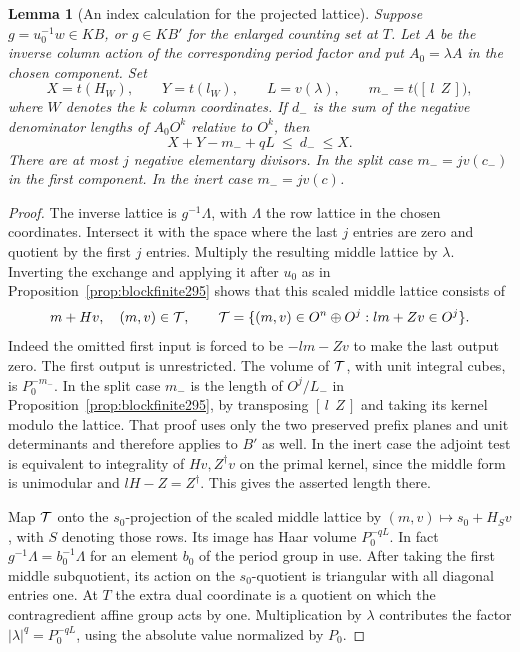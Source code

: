 \documentclass[a4paper,11pt]{article}
\newtheorem{lemma}[proposition]{Lemma}
\theoremstyle{definition}
\theoremstyle{remark}
\numberwithin{equation}{section}
\begin{document}
\begin{lemma}[An index calculation for the projected lattice]\leavevmode
\label{lem:blocklattice297}
Suppose \(g=u_0^{-1}w\in KB\), or \(g\in KB'\) for the
enlarged counting set at \(T\). Let \(A\) be the inverse
column action of the corresponding period factor and put
\(A_0=\lambda A\) in the chosen component. Set
\[
     X=t(H_W),\qquad Y=t(l_W),\qquad L=v(\lambda),
 \qquad m_-=t\bigl([\,l\ \ Z\,]\bigr),
\]
where \(W\) denotes the \(k\) column coordinates.
If \(d_-\) is the sum of the negative denominator lengths of
\(A_0 O^k\) relative to \(O^k\), then
\[
         X+Y-m_-+qL\ \le\ d_-\ \le X.
\]
There are at most \(j\) negative elementary divisors.
In the split case \(m_-=jv(c_-)\) in the first component.
In the inert case \(m_-=jv(c)\).
\end{lemma}
\begin{proof}
The inverse lattice is \(g^{-1}\Lambda\), with \(\Lambda\)
the row lattice in the chosen coordinates. Intersect it with
the space where the last \(j\) entries are zero and quotient
by the first \(j\) entries. Multiply the resulting middle
lattice by \(\lambda\). Inverting the exchange and applying
it after \(u_0\) as in Proposition~\ref{prop:blockfinite295}
shows that this scaled middle lattice consists of
\[
 m+Hv,\quad (m,v)\in{\cal T},\qquad
 {\cal T}=\{(m,v)\in O^n\oplus O^j:lm+Zv\in O^j\}.
\]
Indeed the omitted first input is forced to be \(-lm-Zv\)
to make the last output zero. The first output is unrestricted.
The volume of \({\cal T}\), with unit integral cubes, is
\(P_0^{-m_-}\). In the split case \(m_-\) is the length
of \(O^j/L_-\) in Proposition~\ref{prop:blockfinite295},
by transposing \([\,l\ \ Z\,]\) and taking its kernel modulo
the lattice. That proof uses only the two preserved prefix
planes and unit determinants and therefore applies to \(B'\)
as well. In the inert case the adjoint test is equivalent
to integrality of \(Hv,Z^\dagger v\) on the primal kernel,
since the middle form is unimodular and
\(lH-Z=Z^\dagger\). This gives the asserted length there.

Map \({\cal T}\) onto the \(s_0\)-projection of the scaled
middle lattice by \((m,v)\mapsto s_0+H_Sv\), with \(S\)
denoting those rows. Its image has Haar volume \(P_0^{-qL}\).
In fact
\(g^{-1}\Lambda=b_0^{-1}\Lambda\) for an element \(b_0\)
of the period group in use. After taking the first middle
subquotient, its action on the \(s_0\)-quotient is triangular
with all diagonal entries one. At \(T\) the extra dual
coordinate is a quotient on which the contragredient affine
group acts by one. Multiplication by \(\lambda\) contributes
the factor \(|\lambda|^q=P_0^{-qL}\), using the absolute
value normalized by \(P_0\).


\end{proof}
\end{document}
